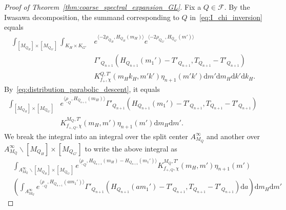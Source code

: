 \documentclass[letterpaper,11pt]{amsart}
\newcommand{\cF}{\mathcal{F}}
\newcommand{\rd}{\mathrm{d}}
\newcommand{\<}{\negthickspace}
\theoremstyle{definition}
\theoremstyle{plain}
\theoremstyle{remark}
\numberwithin{equation}{section}
\begin{document}
\begin{proof}[Proof of Theorem~\ref{thm:coarse_spectral_expansion_GL}]
Fix a $Q \in \cF$. By the Iwasawa decomposition, the summand
corresponding to $Q$ in~\eqref{eq:I_chi_inversion} equals
    \begin{align*}
    \int_{[M_{Q_H}] \times [M_{Q_{G'}}]} \int_{K_H \times K_{G'}}
    &e^{\langle -2\rho_{Q_H},H_{Q_H}(m_H) \rangle}
    e^{\langle -2\rho_{Q_{G'}},H_{Q_{G'}}(m') \rangle}\\
    &\Gamma'_{Q_{n+1}}(H_{Q_{n+1}}(m_1')-T'_{Q_{n+1}},T_{Q_{n+1}}-T'_{Q_{n+1}})\\
    &K_{f_+,\chi}^{Q,T'}(m_Hk_H,m'k') \eta_{n+1}(m'k')
    \rd m' \rd m_H \rd k' \rd k_H.
    \end{align*}
By~\eqref{eq:distribution_parabolic_descent}, it equals
    \[
    \begin{aligned}
    \int_{[M_{Q_H}] \times [M_{Q_{G'}}]}
    &e^{ \langle \underline{\rho}_Q, H_{Q_{n+1}}(m_H) \rangle}
    \Gamma'_{Q_{n+1}}(H_{Q_{n+1}}(m_1')-T'_{Q_{n+1}},T_{Q_{n+1}}-T'_{Q_{n+1}})\\
    &K_{f_{+,Q},\chi}^{M_Q,T'}(m_H,m') \eta_{n+1}(m') \rd m_H \rd m'.
    \end{aligned}
    \]
We break the integral into an integral over the split center $A_{M_Q}^\infty$
and another over $A_{M_Q}^\infty \backslash [M_{Q_H}] \times [M_{Q_{G'}}]$ to write
the above integral as
    \begin{equation}    \label{eq:polynomial_exponential_final_step}
    \begin{aligned}
    &\int_{A_{M_Q}^\infty \backslash [M_{Q_H}] \times [M_{Q_{G'}}]}
    e^{ \langle \underline{\rho}_Q, H_{Q_{n+1}}(m_H)-H_{Q_{n+1}}(m_1') \rangle}
    K_{f_{+,Q},\chi}^{M_Q,T'}(m_H,m') \eta_{n+1}(m') \\
    &\left( \int_{A_{M_Q}^\infty}
    e^{\langle \underline{\rho}_Q, H_{Q_{n+1}}(a m_1') \rangle}
    \Gamma'_{Q_{n+1}}(H_{Q_{n+1}}(am_1')-T'_{Q_{n+1}},T_{Q_{n+1}}-T'_{Q_{n+1}})
    \rd a \right) \rd m_H \rd m'
    \end{aligned}
    \end{equation}


\end{proof}
\end{document}
